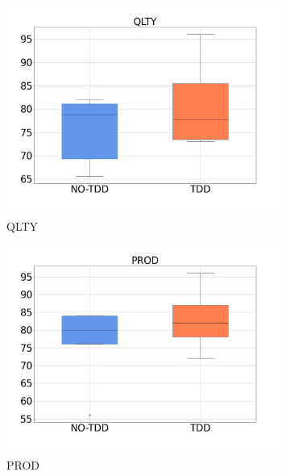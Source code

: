 \begin{figure}[H]
    \centering
    \begin{subfigure}{0.33\textwidth}
        \includegraphics[width=\linewidth]{figures/box_plots/task1/QLTY.png}
        \caption{QLTY}
        \label{bp_task1_prod}
    \end{subfigure}\hfil
        \begin{subfigure}{0.33\textwidth}
        \includegraphics[width=\linewidth]{figures/box_plots/task1/PROD.png}
        \caption{PROD}
        \label{bp_task1_prod}
    \end{subfigure}\hfil
    \begin{subfigure}{0.33\textwidth}

\end{subfigure}
\end{figure}
